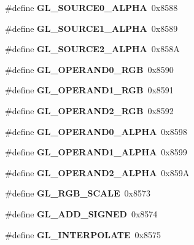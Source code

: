 \begin{DoxyCompactItemize}
\item 
\#define {\bfseries G\+L\+\_\+\+S\+O\+U\+R\+C\+E0\+\_\+\+A\+L\+P\+H\+A}~0x8588\label{_s_d_l__opengl_8h_aeae9bfcce5a919f700d60fc24a36e3bf}

\item 
\#define {\bfseries G\+L\+\_\+\+S\+O\+U\+R\+C\+E1\+\_\+\+A\+L\+P\+H\+A}~0x8589\label{_s_d_l__opengl_8h_ad0201b0486b1e48c92cd0e98aebb3d05}

\item 
\#define {\bfseries G\+L\+\_\+\+S\+O\+U\+R\+C\+E2\+\_\+\+A\+L\+P\+H\+A}~0x858\+A\label{_s_d_l__opengl_8h_af9507cfed117a6fb4a90f1c2f8457707}

\item 
\#define {\bfseries G\+L\+\_\+\+O\+P\+E\+R\+A\+N\+D0\+\_\+\+R\+G\+B}~0x8590\label{_s_d_l__opengl_8h_a97cb8ba4f6f099566ab373ad4254cd65}

\item 
\#define {\bfseries G\+L\+\_\+\+O\+P\+E\+R\+A\+N\+D1\+\_\+\+R\+G\+B}~0x8591\label{_s_d_l__opengl_8h_ae33197196d9b7d4171c133728294e2d9}

\item 
\#define {\bfseries G\+L\+\_\+\+O\+P\+E\+R\+A\+N\+D2\+\_\+\+R\+G\+B}~0x8592\label{_s_d_l__opengl_8h_a0065ddd6026c47784f8f9c4b14e30203}

\item 
\#define {\bfseries G\+L\+\_\+\+O\+P\+E\+R\+A\+N\+D0\+\_\+\+A\+L\+P\+H\+A}~0x8598\label{_s_d_l__opengl_8h_a4858581ec49b6bb7a23205a1103984a1}

\item 
\#define {\bfseries G\+L\+\_\+\+O\+P\+E\+R\+A\+N\+D1\+\_\+\+A\+L\+P\+H\+A}~0x8599\label{_s_d_l__opengl_8h_a98df3c998ca3bbe641306fbcc5ba7426}

\item 
\#define {\bfseries G\+L\+\_\+\+O\+P\+E\+R\+A\+N\+D2\+\_\+\+A\+L\+P\+H\+A}~0x859\+A\label{_s_d_l__opengl_8h_a929e99a6d416dd551747b4123fc1fac4}

\item 
\#define {\bfseries G\+L\+\_\+\+R\+G\+B\+\_\+\+S\+C\+A\+L\+E}~0x8573\label{_s_d_l__opengl_8h_add3c8e05aff8c0afefa64707ef366915}

\item 
\#define {\bfseries G\+L\+\_\+\+A\+D\+D\+\_\+\+S\+I\+G\+N\+E\+D}~0x8574\label{_s_d_l__opengl_8h_a312488560198574eb8fde9970fe26747}

\item 
\#define {\bfseries G\+L\+\_\+\+I\+N\+T\+E\+R\+P\+O\+L\+A\+T\+E}~0x8575\label{_s_d_l__opengl_8h_a8287eef1d8138f5cd1cd7cce1bc8e8b2}


\end{DoxyCompactItemize}
